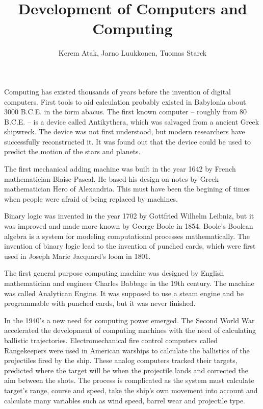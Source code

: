 \documentclass[a4paper,12pt]{article}
\begin{document}
\title{Development of Computers and Computing}
\author{Kerem Atak, Jarno Luukkonen, Tuomas Starck}
\maketitle

Computing has existed thousands of years before the invention of digital computers. First tools to aid calculation probably existed in Babylonia about 3000 B.C.E. in the form abacus\cite{js95}. The first known computer -- roughly from 80 B.C.E. -- is a device called Antikythera, which was salvaged from a ancient Greek shipwreck. The device was not first understood, but modern researchers have successfully reconstructed it. It was found out that the device could be used to predict the motion of the stars and planets\cite{amrp}.

The first mechanical adding machine was built in the year 1642 by French mathematician Blaise Pascal. He based his design on notes by Greek mathematician Hero of Alexandria. This must have been the begining of times when people were afraid of being replaced by machines\cite{mh06}.

Binary logic was invented in the year 1702 by Gottfried Wilhelm Leibniz, but it was improved and made more known by George Boole in 1854. Boole's Boolean algebra is a system for modeling computational processes mathematically. The invention of binary logic lead to the invention of punched cards, which were first used in Joseph Marie Jacquard's loom in 1801.

The first general purpose computing machine was designed by English mathematician and engineer Charles Babbage in the 19th century. The machine was called Analytican Engine. It was supposed to use a steam engine and be programmable with punched cards, but it was never finished.

In the 1940's a new need for computing power emerged. The Second World War accelerated the development of computing machines with the need of calculating ballistic trajectories. Electromechanical fire control computers called Rangekeepers were used in American warships to calculate the ballistics of the projectiles fired by the ship. These analog computers tracked their targets, predicted where the target will be when the projectile lands and corrected the aim between the shots. The process is complicated as the system must calculate target's range, course and speed, take the ship's own movement into account and calculate many variables such as wind speed, barrel wear and projectile type.
\end{document}
